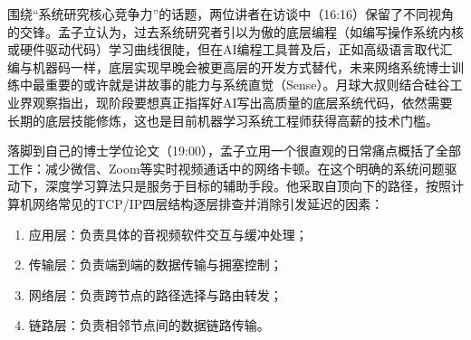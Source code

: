 \documentclass[UTF8,a4paper,11pt,fontset=fandol]{ctexart}
\begin{document}
围绕“系统研究核心竞争力”的话题，两位讲者在访谈中（16:16）保留了不同视角的交锋。孟子立认为，过去系统研究者引以为傲的底层编程（如编写操作系统内核或硬件驱动代码）学习曲线很陡，但在AI编程工具普及后，正如高级语言取代汇编与机器码一样，底层实现早晚会被更高层的开发方式替代，未来网络系统博士训练中最重要的或许就是讲故事的能力与系统直觉（Sense）。月球大叔则结合硅谷工业界观察指出，现阶段要想真正指挥好AI写出高质量的底层系统代码，依然需要长期的底层技能修炼，这也是目前机器学习系统工程师获得高薪的技术门槛。

落脚到自己的博士学位论文（19:00），孟子立用一个很直观的日常痛点概括了全部工作：减少微信、Zoom等实时视频通话中的网络卡顿。在这个明确的系统问题驱动下，深度学习算法只是服务于目标的辅助手段。他采取自顶向下的路径，按照计算机网络常见的TCP/IP四层结构逐层排查并消除引发延迟的因素：
\begin{enumerate}
\item 应用层：负责具体的音视频软件交互与缓冲处理；
\item 传输层：负责端到端的数据传输与拥塞控制；
\item 网络层：负责跨节点的路径选择与路由转发；
\item 链路层：负责相邻节点间的数据链路传输。
\end{enumerate}
\end{document}
